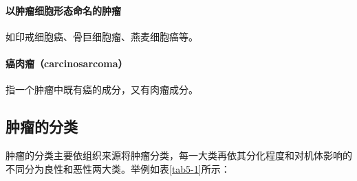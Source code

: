 \paragraph{以肿瘤细胞形态命名的肿瘤}
如印戒细胞癌、骨巨细胞瘤、燕麦细胞癌等。

\paragraph{癌肉瘤（carcinosarcoma）}
指一个肿瘤中既有癌的成分，又有肉瘤成分。

\subsection{肿瘤的分类}

肿瘤的分类主要依组织来源将肿瘤分类，每一大类再依其分化程度和对机体影响的不同分为良性和恶性两大类。举例如表\ref{tab5-1}所示：

